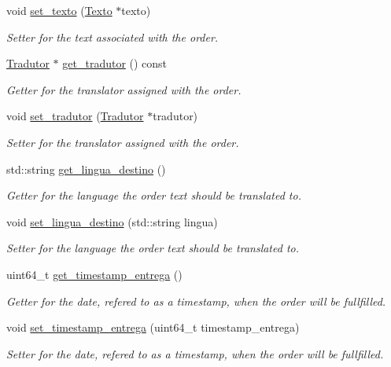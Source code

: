 \begin{DoxyCompactItemize}
void \hyperlink{class_encomenda_ab814e5f0fbbb1950393a376eb65f7c63}{set\-\_\-texto} (\hyperlink{class_texto}{Texto} $\ast$texto)
\begin{DoxyCompactList}\small\item\em Setter for the text associated with the order. \end{DoxyCompactList}\item 
\hyperlink{class_tradutor}{Tradutor} $\ast$ \hyperlink{class_encomenda_a50c1aefd950ca5852e93beec8882db70}{get\-\_\-tradutor} () const 
\begin{DoxyCompactList}\small\item\em Getter for the translator assigned with the order. \end{DoxyCompactList}\item 
void \hyperlink{class_encomenda_a05d46d1c4f6e83df419b2feb7cb9a082}{set\-\_\-tradutor} (\hyperlink{class_tradutor}{Tradutor} $\ast$tradutor)
\begin{DoxyCompactList}\small\item\em Setter for the translator assigned with the order. \end{DoxyCompactList}\item 
std\-::string \hyperlink{class_encomenda_a3b9689429c6ae78580421a96742f9687}{get\-\_\-lingua\-\_\-destino} ()
\begin{DoxyCompactList}\small\item\em Getter for the language the order text should be translated to. \end{DoxyCompactList}\item 
void \hyperlink{class_encomenda_af8b12f8fba9c65a937f60ed81f9e0770}{set\-\_\-lingua\-\_\-destino} (std\-::string lingua)
\begin{DoxyCompactList}\small\item\em Setter for the language the order text should be translated to. \end{DoxyCompactList}\item 
uint64\-\_\-t \hyperlink{class_encomenda_a14dd37345213a30a428457f9b5df874d}{get\-\_\-timestamp\-\_\-entrega} ()
\begin{DoxyCompactList}\small\item\em Getter for the date, refered to as a timestamp, when the order will be fullfilled. \end{DoxyCompactList}\item 
void \hyperlink{class_encomenda_a894c2ddbe25e0fa49f19fe35134ce3ba}{set\-\_\-timestamp\-\_\-entrega} (uint64\-\_\-t timestamp\-\_\-entrega)
\begin{DoxyCompactList}\small\item\em Setter for the date, refered to as a timestamp, when the order will be fullfilled. \end{DoxyCompactList}\end{DoxyCompactItemize}
